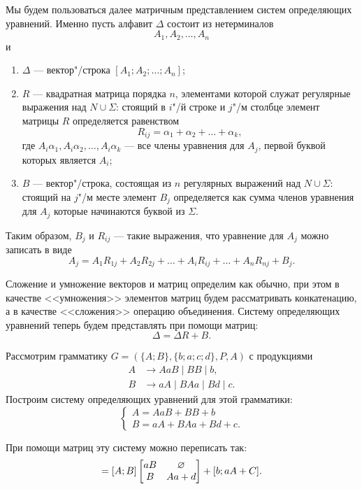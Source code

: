 Мы будем пользоваться далее матричным представлением систем
определяющих уравнений. Именно пусть алфавит $\Delta$ состоит из
нетерминалов
\[
A_1, A_2, \ldots , A_n
\]
и
\begin{enumerate}
    \item $\Delta$ --- вектор"/строка $[A_1;A_2;\ldots ;A_n]$;

    \item $R$ --- квадратная матрица порядка $n$, элементами которой
    служат регулярные выражения над $N\cup\Sigma$: стоящий в $i$"/й
    строке и $j$"/м столбце элемент матрицы $R$ определяется равенством
    \[
        R_{ij} = \alpha_1 + \alpha_2 + \ldots + \alpha_k,
    \]
    где $A_i\alpha_1, A_i\alpha_2, \ldots , A_i\alpha_k$ --- все члены
    уравнения для $A_j$, первой буквой которых является $A_i$;

    \item $B$ --- вектор"/строка, состоящая из $n$ регулярных
    выражений над $N\cup\Sigma$: стоящий на $j$"/м месте элемент $B_j$
    определяется как сумма членов уравнения для $A_j$ которые
    начинаются буквой из $\Sigma$.
\end{enumerate}

Таким образом, $B_j$ и $R_{ij}$ --- такие выражения, что уравнение для $A_j$ можно записать в виде
\[
A_j = A_1R_{1j} + A_2R_{2j} + \ldots + A_iR_{ij} + \ldots + A_nR_{nj} + B_j.
\]

Сложение и умножение векторов и матриц определим как обычно, при этом в качестве <<умножения>> элементов матриц будем рассматривать конкатенацию, а в качестве <<сложения>> операцию объединения. Систему определяющих уравнений теперь будем представлять при помощи матриц:
\begin{equation}
\label{eqGeneralSOS}
\Delta=\Delta R+B.
\end{equation}

\begin{myexample}
\label{example-MatrView}
Рассмотрим грамматику $G=(\{A;B\},\{b;a;c;d\},P,A)$ с продукциями
\begin{align*}
    A &\to AaB \mid BB \mid b, \\
    B &\to aA \mid BAa \mid Bd \mid c.
\end{align*}
Построим систему определяющих уравнений для этой грамматики:
\begin{equation*}
\begin{cases}
	A = AaB + BB + b \\
	B = aA + BAa + Bd + c.
\end{cases}
\end{equation*}

При помощи матриц эту систему можно переписать так:
\begin{equation}
[A;B] = [A;B]
\begin{bmatrix}
aB & \es \\
B & Aa+d
\end{bmatrix} + [b;aA+C].
\end{equation}
\end{myexample}

